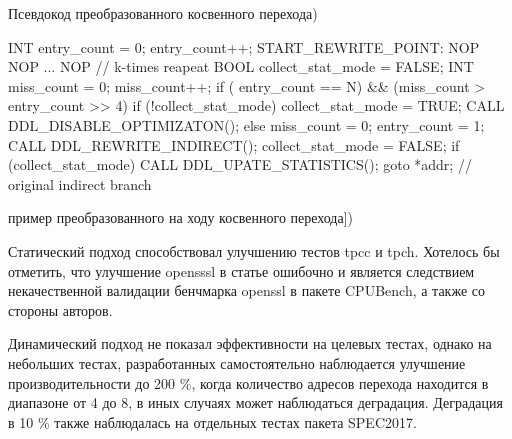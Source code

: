 \begin{ListingEnv}[!h]
	\captiondelim{ } %
	\caption{Псевдокод преобразованного косвенного перехода)}\label{indirect_algo1}
	
	\begin{Verb}
		
		INT entry_count = 0;
		entry_count++;
		START_REWRITE_POINT:
		NOP
		NOP
		...
		NOP // k-times reapeat
		BOOL collect_stat_mode = FALSE;
		INT miss_count = 0;
		miss_count++;
		if ( entry_count == N)
		&& (miss_count > entry_count >> 4) {
			if (!collect_stat_mode){
				collect_stat_mode = TRUE;
				CALL DDL_DISABLE_OPTIMIZATON();
			} else {
				miss_count = 0;
				entry_count = 1;
				CALL DDL_REWRITE_INDIRECT();
				collect_stat_mode = FALSE;
			}
		}
		if (collect_stat_mode) {
			CALL DDL_UPATE_STATISTICS();
		}
		goto *addr; // original indirect branch
		
	\end{Verb}
\end{ListingEnv} 


\begin{ListingEnv}[!h]
	\captiondelim{ } %
	\caption{пример преобразованного на ходу косвенного перехода])}\label{indirect_algo2}
	
\end{ListingEnv} 

Статический подход способствовал улучшению тестов tpcc и tpch. Хотелось бы отметить, что улучшение opensssl в статье \cite{chernonog2023статический} ошибочно и является следствием некачественной валидации бенчмарка openssl в пакете CPUBench, а также со стороны авторов.

Динамический подход не показал эффективности на целевых тестах, однако на небольших тестах, разработанных самостоятельно наблюдается улучшение производительности до 200 \%, когда количество адресов перехода находится в диапазоне от 4 до 8, в иных случаях может наблюдаться деградация. Деградация в 10 \% также наблюдалась на отдельных тестах пакета SPEC2017.

